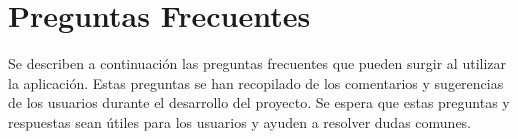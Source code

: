 \chapter{Preguntas Frecuentes}

\noindent Se describen a continuación las preguntas frecuentes que pueden surgir al utilizar la aplicación. Estas preguntas se han recopilado de los comentarios y sugerencias de los usuarios durante el desarrollo del proyecto. Se espera que estas preguntas y respuestas sean útiles para los usuarios y ayuden a resolver dudas comunes.